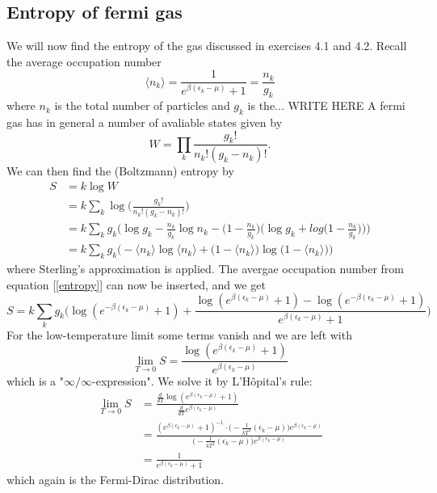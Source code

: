 \documentclass[norsk,a4paper,12pt]{article}
\begin{document}
\subsection{Entropy of fermi gas}
We will now find the entropy of the gas discussed in exercises 4.1 and 4.2. Recall the average occupation number
\begin{equation}
\langle n_k\rangle = \frac{1}{e^{\beta(\epsilon_k-\mu)}+1}=\frac{n_k}{g_k}
\label{entropy}
\end{equation}
where $n_k$ is the total number of particles and $g_k$ is the... WRITE HERE
A fermi gas has in general a number of avaliable states given by
\begin{equation}
W=\prod_k\frac{g_k!}{n_k!(g_k-n_k)!}.
\end{equation}
We can then find the (Boltzmann) entropy by
\begin{align}
S&=k\log W\\
&=k\sum_k\log\bigg(\frac{g_k!}{n_k!(g_k-n_k)!}\bigg)\\
&=k\sum_kg_k\bigg(\log g_k-\frac{n_k}{g_k}\log n_k-\Big(1-\frac{n_k}{g_k}\Big)\Big(\log g_k + log\big(1-\frac{n_k}{g_k}\big)\Big)\bigg)\\
&=k\sum_kg_k\Big(-\langle n_k\rangle\log\langle n_k\rangle+\big(1-\langle n_k\rangle\big)\log\big(1-\langle n_k\rangle\big)\Big)
\end{align}
where Sterling's approximation is applied. The avergae occupation number from equation [\ref{entropy}] can now be inserted, and we get
\begin{equation*}
S=k\sum_kg_k\bigg(\log(e^{-\beta(\epsilon_k-\mu)}+1)+\frac{\log(e^{\beta(\epsilon_k-\mu)}+1)-\log(e^{-\beta(\epsilon_k-\mu)}+1)}{e^{\beta(\epsilon_k -\mu)}+1}\bigg)
\end{equation*}
For the low-temperature limit some terms vanish and we are left with
\begin{equation}
\lim_{T\rightarrow 0}S=\frac{\log(e^{\beta(\epsilon_k-\mu)}+1)}{e^{\beta(\epsilon_k -\mu)}}
\end{equation}
which is a "$\infty/\infty$-expression". We solve it by L'Hôpital's rule:
\begin{align}
\lim_{T\rightarrow 0}S&=\frac{\frac{d}{dT}\log(e^{\beta(\epsilon_k-\mu)}+1)}{\frac{d}{dT}e^{\beta(\epsilon_k -\mu)}}\\
&=\frac{(e^{\beta(\epsilon_k-\mu)}+1)^{-1}\cdot\big(-\frac{1}{kT^2}(\epsilon_k-\mu)\big)e^{\beta(\epsilon_k-\mu)}}{\big(-\frac{1}{kT^2}(\epsilon_k-\mu)\big)e^{\beta(\epsilon_k-\mu)}}\\
&=\frac{1}{e^{\beta(\epsilon_k-\mu)}+1}
\end{align}
which again is the Fermi-Dirac distribution.
\end{document}
